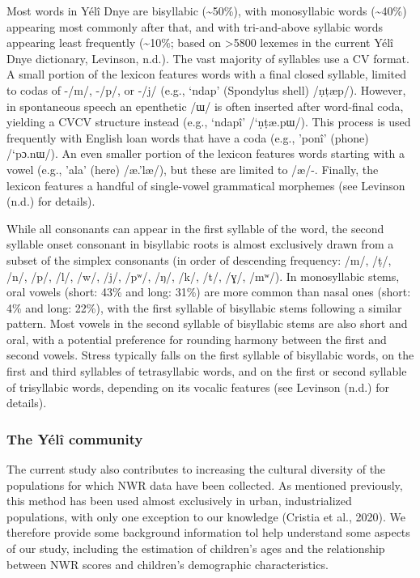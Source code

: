 \documentclass[english,,man,floatsintext]{apa6}
\begin{document}
Most words in Yélî Dnye are bisyllabic (\textasciitilde{}50\%), with monosyllabic words (\textasciitilde{}40\%) appearing most commonly after that, and with tri-and-above syllabic words appearing least frequently (\textasciitilde{}10\%; based on \textgreater{}5800 lexemes in the current Yélî Dnye dictionary, Levinson, n.d.). The vast majority of syllables use a CV format. A small portion of the lexicon features words with a final closed syllable, limited to codas of -/m/, -/p/, or -/j/ (e.g., `ndap' (Spondylus shell) /ṇṭæp/). However, in spontaneous speech an epenthetic /ɯ/ is often inserted after word-final coda, yielding a CVCV structure instead (e.g., `ndapî' /`ṇṭæ.pɯ/). This process is used frequently with English loan words that have a coda (e.g., 'ponî' (phone) /`pɔ.nɯ/). An even smaller portion of the lexicon features words starting with a vowel (e.g., 'ala' (here) /æ.'læ/), but these are limited to /æ/-. Finally, the lexicon features a handful of single-vowel grammatical morphemes (see Levinson (n.d.) for details).

While all consonants can appear in the first syllable of the word, the second syllable onset consonant in bisyllabic roots is almost exclusively drawn from a subset of the simplex consonants (in order of descending frequency: /m/, /ṭ/, /n/, /p/, /l/, /w/, /j/, /pʷ/, /ŋ/, /k/, /t/, /ɣ/, /mʷ/). In monosyllabic stems, oral vowels (short: 43\% and long: 31\%) are more common than nasal ones (short: 4\% and long: 22\%), with the first syllable of bisyllabic stems following a similar pattern. Most vowels in the second syllable of bisyllabic stems are also short and oral, with a potential preference for rounding harmony between the first and second vowels. Stress typically falls on the first syllable of bisyllabic words, on the first and third syllables of tetrasyllabic words, and on the first or second syllable of trisyllabic words, depending on its vocalic features (see Levinson (n.d.) for details).

\hypertarget{the-yuxe9luxee-community}{%
\subsubsection{The Yélî community}\label{the-yuxe9luxee-community}}

The current study also contributes to increasing the cultural diversity of the populations for which NWR data have been collected. As mentioned previously, this method has been used almost exclusively in urban, industrialized populations, with only one exception to our knowledge (Cristia et al., 2020). We therefore provide some background information tol help understand some aspects of our study, including the estimation of children's ages and the relationship between NWR scores and children's demographic characteristics.
\end{document}
